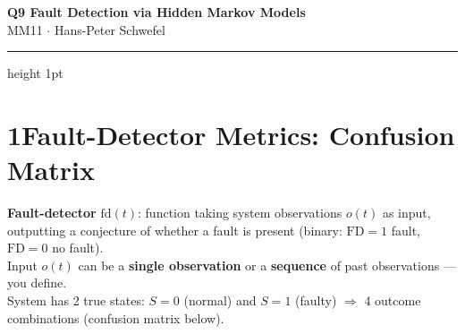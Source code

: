 \documentclass[10pt,a4paper]{article}
\begin{document}

\begin{center}
  {\large\bfseries\color{headernavy} Q9 \textemdash{} Fault Detection via Hidden Markov Models}\\[1pt]
  {\small MM11 $\cdot$ Hans-Peter Schwefel}
\end{center}
\vspace{1pt}\hrule height 1pt\vspace{3pt}

\section*{1\quad Fault-Detector Metrics: Confusion Matrix}
\begin{defbox}
\textbf{Fault-detector} $\mathrm{fd}(t)$: function taking system observations $o(t)$ as input, outputting a conjecture of whether a fault is present (binary: $\mathrm{FD}{=}1$ fault, $\mathrm{FD}{=}0$ no fault).\\[2pt]
Input $o(t)$ can be a \textbf{single observation} or a \textbf{sequence} of past observations --- you define.\\[2pt]
System has 2 true states: $S{=}0$ (normal) and $S{=}1$ (faulty) $\Rightarrow$ 4 outcome combinations (confusion matrix below).
\end{defbox}
\vspace{3pt}
\end{document}
